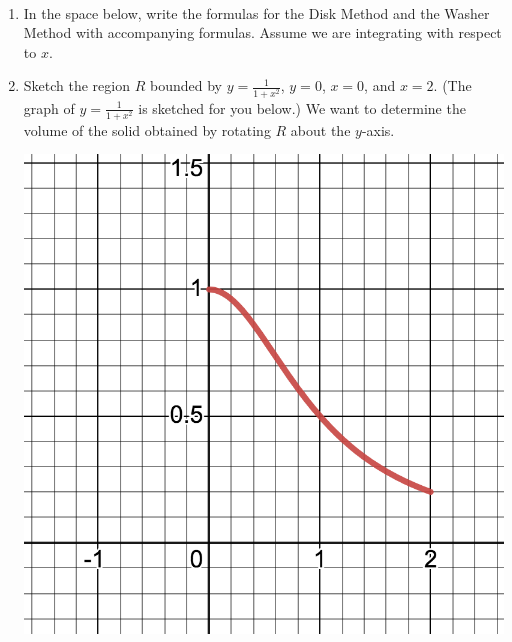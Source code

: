 \documentclass[11pt,fleqn]{article}
\begin{document}
\renewcommand{\headrulewidth}{0pt}
\newcommand{\blank}[1]{\rule{#1}{0.75pt}}
\newcommand{\bc}{\begin{center}}
\newcommand{\ec}{\end{center}}
\renewcommand{\d}{\displaystyle}

\vspace*{-0.7in}

\begin{center}
  \large
  \\
\end{center}

\begin{enumerate}
\item In the space below, write the formulas for the Disk Method and the Washer Method with accompanying formulas. Assume we are integrating with respect to $x.$\\
\vfill

\item Sketch the region $R$ bounded by $y=\frac{1}{1+x^2}$, $y=0$, $x=0$, and $x=2.$ (The graph of $y=\frac{1}{1+x^2}$ is sketched for you below.) We want to determine the volume of the solid obtained by rotating $R$ about the $y$-axis. \\

\begin{center}
\includegraphics[scale=0.2]{pic-2-3-a.png} 
\end{center}


\end{enumerate}
\end{document}
